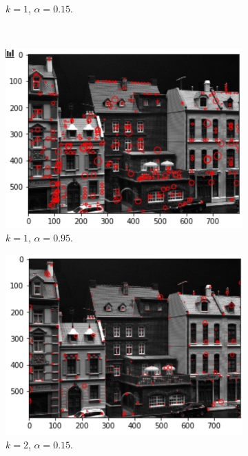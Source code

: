 \begin{figure}[H]
\begin{subfigure}[b]{0.42\linewidth}
		\caption{$k = 1$, $\alpha = 0.15$.}
	\end{subfigure}
	\\
	\begin{subfigure}[b]{0.42\linewidth}
		\centering
		\includegraphics[width=\linewidth]{Materials/E3/k1a095}
		\caption{$k = 1$, $\alpha = 0.95$.}
	\end{subfigure}
	\hfill
	\begin{subfigure}[b]{0.42\linewidth}
		\centering
		\includegraphics[width=\linewidth]{Materials/E3/k4a005}
		\caption{$k = 2$, $\alpha = 0.15$.}
	\end{subfigure}
	\begin{subfigure}[b]{0.42\linewidth}
		\centering

\end{subfigure}
\end{figure}
